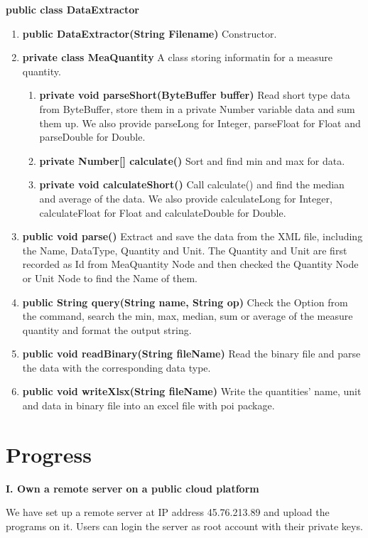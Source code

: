 \documentclass[a4paper,12pt]{article}
\begin{document}
	\noindent\textbf{public class DataExtractor}
	\begin{enumerate}
		\item \textbf{public DataExtractor(String Filename)} Constructor.
		\item \textbf{private class MeaQuantity} A class storing informatin for a measure quantity.
		\begin{enumerate}
			\item \textbf{private void parseShort(ByteBuffer buffer)} Read short type data from ByteBuffer, store them in a private Number variable data and sum them up. We also provide parseLong for Integer, parseFloat for Float and parseDouble for Double.
			\item \textbf{private Number[] calculate()} Sort and find min and max for data.
			\item \textbf{private void calculateShort()} Call calculate() and find the median and average of the data. We also provide calculateLong for Integer, calculateFloat for Float and calculateDouble for Double.
		\end{enumerate}
		\item \textbf{public void parse()} Extract and save the data from the XML file, including the Name, DataType, Quantity and Unit. The Quantity and Unit are first recorded as Id from MeaQuantity Node and then checked the Quantity Node or Unit Node to find the Name of them.
		\item \textbf{public String query(String name, String op)} Check the Option from the command, search the min, max, median, sum or average of the measure quantity and format the output string.
		\item \textbf{public void readBinary(String fileName)} Read the binary file and parse the data with the corresponding data type.
		\item \textbf{public void writeXlsx(String fileName)} Write the quantities' name, unit and data in binary file into an excel file with poi package.
	\end{enumerate}
	
	
	\section{Progress}
	\noindent\textbf{I. Own a remote server on a public cloud platform}
	
	We have set up a remote server at IP address 45.76.213.89 and upload the programs on it. Users can login the server as root account with their private keys.  
	
\end{document}
